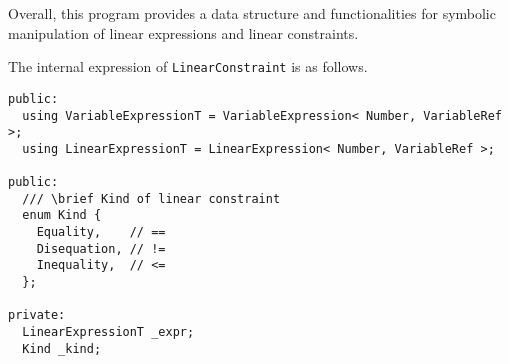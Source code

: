 \documentclass[12pt]{article}
\begin{document}
Overall, this program provides a data structure and functionalities for symbolic manipulation of linear expressions and linear constraints.

The internal expression of \texttt{LinearConstraint} is as follows.
\begin{lstlisting}
public:
  using VariableExpressionT = VariableExpression< Number, VariableRef >;
  using LinearExpressionT = LinearExpression< Number, VariableRef >;

public:
  /// \brief Kind of linear constraint
  enum Kind {
    Equality,    // ==
    Disequation, // !=
    Inequality,  // <=
  };

private:
  LinearExpressionT _expr;
  Kind _kind;
\end{lstlisting}
\end{document}
